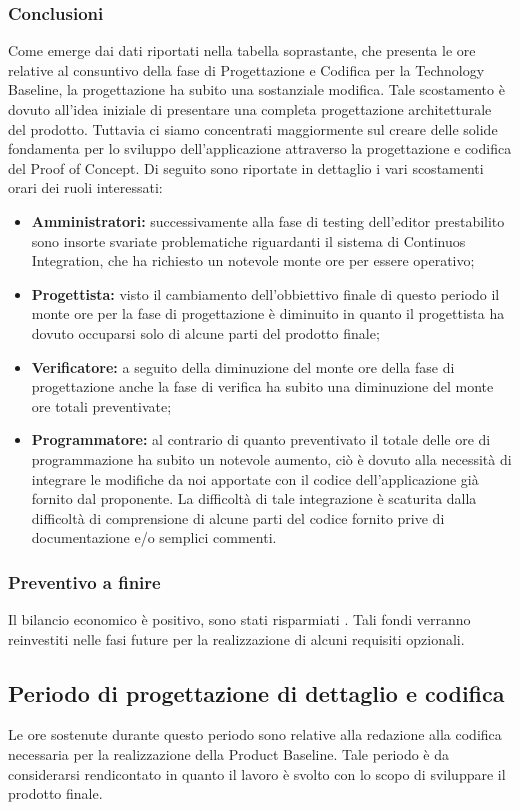 \subsubsection{Conclusioni}
Come emerge dai dati riportati nella tabella soprastante, che presenta le ore relative al consuntivo della fase di Progettazione e Codifica per la Technology Baseline, la progettazione ha subito una sostanziale modifica. Tale scostamento è dovuto all'idea iniziale di presentare una completa progettazione architetturale del prodotto. Tuttavia ci siamo concentrati maggiormente sul creare delle solide fondamenta per lo sviluppo dell'applicazione attraverso la progettazione e codifica del Proof of Concept\glo. Di seguito sono riportate in dettaglio i vari scostamenti orari dei ruoli interessati:
\begin{itemize}
\item \textbf{Amministratori:} successivamente alla fase di testing dell'editor prestabilito sono insorte svariate problematiche riguardanti il sistema di Continuos Integration\glo, che ha richiesto un notevole monte ore per essere operativo;
\item \textbf{Progettista:} visto il cambiamento dell'obbiettivo finale di questo periodo il monte ore per la fase di progettazione è diminuito in quanto il progettista ha dovuto occuparsi solo di alcune parti del prodotto finale; 
\item \textbf{Verificatore:} a seguito della diminuzione del monte ore della fase di progettazione anche la fase di verifica ha subito una diminuzione del monte ore totali preventivate;
\item \textbf{Programmatore:} al contrario di quanto preventivato il totale delle ore di programmazione ha subito un notevole aumento, ciò è dovuto alla necessità di integrare le modifiche da noi apportate con il codice dell'applicazione già fornito dal proponente. La difficoltà di tale integrazione è scaturita dalla difficoltà di comprensione di alcune parti del codice fornito prive di documentazione e/o semplici commenti.
\end{itemize}

\subsubsection{Preventivo a finire}
Il bilancio economico è positivo, sono stati risparmiati . Tali fondi verranno reinvestiti nelle fasi future per la realizzazione di alcuni requisiti opzionali.


\subsection{Periodo di progettazione di dettaglio e codifica}
Le ore sostenute durante questo periodo sono relative alla redazione alla codifica necessaria per la realizzazione della Product Baseline\glo. Tale periodo è da considerarsi rendicontato in quanto il lavoro è svolto con lo scopo di sviluppare il prodotto finale.


